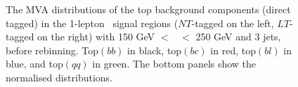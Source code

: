 \begin{figure}[!htbp]
    \centering
      \caption{The MVA distributions of the top background components (direct tagged) in the 1-lepton \vhc\ signal regions ($NT$-tagged on the left, $LT$-tagged on the right) with 150 GeV $<$ \ptv\ $<$ 250 GeV and 3 jets, before rebinning. Top$(bb)$ in black, top$(bc)$ in red, top$(bl)$ in blue, and top$(qq)$ in green. The bottom panels show the normalised distributions.} 
      \label{fig:topflavdistr_VHcc}
\end{figure}

